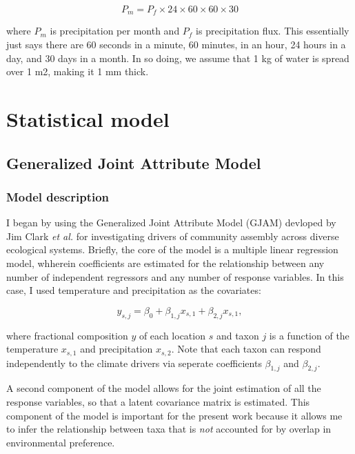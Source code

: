 \documentclass[11pt]{article}
\begin{document}
\[P_m = P_f \times 24 \times 60 \times 60 \times 30\]

where \(P_m\) is precipitation per month and \(P_f\) is precipitation
flux. This essentially just says there are 60 seconds in a minute, 60
minutes, in an hour, 24 hours in a day, and 30 days in a month. In so
doing, we assume that 1 kg of water is spread over 1 m2, making it 1 mm
thick.

    \hypertarget{statistical-model}{%
\section{Statistical model}\label{statistical-model}}

\hypertarget{generalized-joint-attribute-model}{%
\subsection{Generalized Joint Attribute
Model}\label{generalized-joint-attribute-model}}

\hypertarget{model-description}{%
\subsubsection{Model description}\label{model-description}}

I began by using the Generalized Joint Attribute Model (GJAM) devloped
by Jim Clark \emph{et al.} for investigating drivers of community
assembly across diverse ecological systems. Briefly, the core of the
model is a multiple linear regression model, whherein coefficients are
estimated for the relationship between any number of independent
regressors and any number of response variables. In this case, I used
temperature and precipitation as the covariates:

\[y_{s,j} = \beta_0 + \beta_{1,j}x_{s,1} + \beta_{2,j}x_{s,1},\]

where fractional composition \(y\) of each location \(s\) and taxon
\(j\) is a function of the temperature \(x_{s,1}\) and precipitation
\(x_{s,2}\). Note that each taxon can respond independently to the
climate drivers via seperate coefficients \(\beta_{1,j}\) and
\(\beta_{2,j}\).

A second component of the model allows for the joint estimation of all
the response variables, so that a latent covariance matrix is estimated.
This component of the model is important for the present work because it
allows me to infer the relationship between taxa that is \emph{not}
accounted for by overlap in environmental preference.
\end{document}
